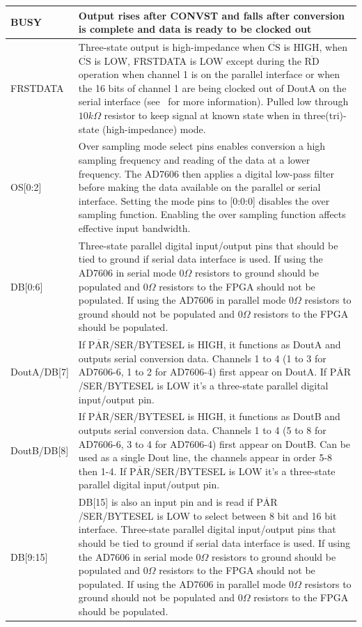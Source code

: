 \begin{singlespace}
\begin{longtable}[h]{|p{1.5in}|p{3.5in}|}
BUSY	& Output rises after CONVST and falls after conversion is complete and data is ready to be clocked out\\
\hline
FRSTDATA	& Three-state output is high-impedance when $\overline{\mathrm{CS}}$ is HIGH, when $\overline{\mathrm{CS}}$ is LOW, FRSTDATA is LOW except during the $\overline{\mathrm{RD}}$ operation when channel 1 is on the parallel interface or when the 16 bits of channel 1 are being clocked out of DoutA on the serial interface (see~\cite{AD7606ds} for more information).  Pulled low through $10\unit{k\Omega}$ resistor to keep signal at known state when in three(tri)-state (high-impedance) mode.\\
\hline
OS[0:2]	& Over sampling mode select pins enables conversion a high sampling frequency and reading of the data at a lower frequency.  The AD7606 then applies a digital low-pass filter before making the data available on the parallel or serial interface.  Setting the mode pins to [0:0:0] disables the over sampling function.  Enabling the over sampling function affects effective input bandwidth.\\
\hline
DB[0:6]	& Three-state parallel digital input/output pins that should be tied to ground if serial data interface is used.  If using the AD7606 in serial mode $0\unit{\Omega}$ resistors to ground should be populated and $0\unit{\Omega}$ resistors to the FPGA should not be populated.  If using the AD7606 in parallel mode $0\unit{\Omega}$ resistors to ground should not be populated and $0\unit{\Omega}$ resistors to the FPGA should be populated.\\
\hline
DoutA/DB[7]	& If $\overline{\mathrm{PAR}}$/SER/BYTESEL is HIGH, it functions as DoutA and outputs serial conversion data. Channels 1 to 4 (1 to 3 for AD7606-6, 1 to 2 for AD7606-4) first appear on DoutA.  If $\overline{\mathrm{PAR}}$/SER/BYTESEL is LOW it's a three-state parallel digital input/output pin.\\
\hline
DoutB/DB[8]	& If $\overline{\mathrm{PAR}}$/SER/BYTESEL is HIGH, it functions as DoutB and outputs serial conversion data. Channels 1 to 4 (5 to 8 for AD7606-6, 3 to 4 for AD7606-4) first appear on DoutB. Can be used as a single Dout line, the channels appear in order 5-8 then 1-4.  If $\overline{\mathrm{PAR}}$/SER/BYTESEL is LOW it's a three-state parallel digital input/output pin.\\
\hline
DB[9:15]	& DB[15] is also an input pin and is read if $\overline{\mathrm{PAR}}$/SER/BYTESEL is LOW to select between 8 bit and 16 bit interface.  Three-state parallel digital input/output pins that should be tied to ground if serial data interface is used.  If using the AD7606 in serial mode $0\unit{\Omega}$ resistors to ground should be populated and $0\unit{\Omega}$ resistors to the FPGA should not be populated.  If using the AD7606 in parallel mode $0\unit{\Omega}$ resistors to ground should not be populated and $0\unit{\Omega}$ resistors to the FPGA should be populated.\\

\end{longtable}
\end{singlespace}
